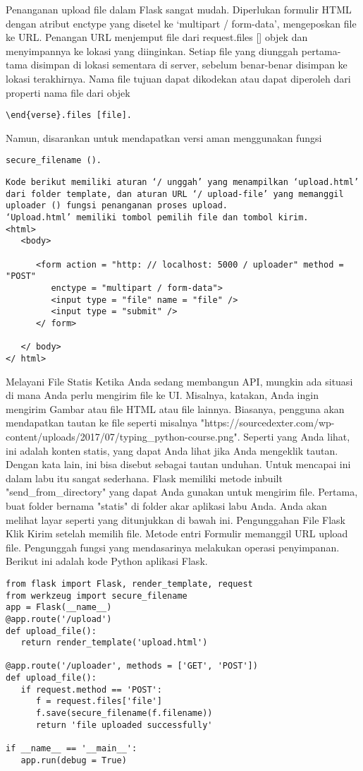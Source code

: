 \documentclass[12pt,a4paper]{article}
\begin{document}
Penanganan upload file dalam Flask sangat mudah. Diperlukan formulir HTML dengan atribut enctype yang disetel ke ‘multipart / form-data’, mengeposkan file ke URL. Penangan URL menjemput file dari request.files [] objek dan menyimpannya ke lokasi yang diinginkan. Setiap file yang diunggah pertama-tama disimpan di lokasi sementara di server, sebelum benar-benar disimpan ke lokasi terakhirnya. Nama file tujuan dapat dikodekan atau dapat diperoleh dari properti nama file dari objek 
\begin{verbatim}
\end{verse}.files [file]. 
\end{verbatim}
Namun, disarankan untuk mendapatkan versi aman menggunakan fungsi 
\begin{verbatim}
secure_filename ().
\end{verbatim}
\begin{verbatim}
Kode berikut memiliki aturan ‘/ unggah’ yang menampilkan ‘upload.html’ dari folder template, dan aturan URL ‘/ upload-file’ yang memanggil uploader () fungsi penanganan proses upload.
‘Upload.html’ memiliki tombol pemilih file dan tombol kirim.
<html>
   <body>
   
      <form action = "http: // localhost: 5000 / uploader" method = "POST"
         enctype = "multipart / form-data">
         <input type = "file" name = "file" />
         <input type = "submit" />
      </ form>
      
   </ body>
</ html>
\end{verbatim}
Melayani File Statis
Ketika Anda sedang membangun API, mungkin ada situasi di mana Anda perlu mengirim file ke UI. Misalnya, katakan, Anda ingin mengirim Gambar atau file HTML atau file lainnya. Biasanya, pengguna akan mendapatkan tautan ke file seperti misalnya "https://sourcedexter.com/wp-content/uploads/2017/07/typing\_python-course.png". Seperti yang Anda lihat, ini adalah konten statis, yang dapat Anda lihat jika Anda mengeklik tautan. Dengan kata lain, ini bisa disebut sebagai tautan unduhan.
Untuk mencapai ini dalam labu itu sangat sederhana. Flask memiliki metode inbuilt "send\_from\_directory" yang dapat Anda gunakan untuk mengirim file. Pertama, buat folder bernama "statis" di folder akar aplikasi labu Anda.
Anda akan melihat layar seperti yang ditunjukkan di bawah ini. Pengunggahan File Flask Klik Kirim setelah memilih file. Metode entri Formulir memanggil URL upload file. Pengunggah fungsi yang mendasarinya melakukan operasi penyimpanan.
Berikut ini adalah kode Python aplikasi Flask.
\begin{verbatim}
from flask import Flask, render_template, request
from werkzeug import secure_filename
app = Flask(__name__)
@app.route('/upload')
def upload_file():
   return render_template('upload.html')
	
@app.route('/uploader', methods = ['GET', 'POST'])
def upload_file():
   if request.method == 'POST':
      f = request.files['file']
      f.save(secure_filename(f.filename))
      return 'file uploaded successfully'
		
if __name__ == '__main__':
   app.run(debug = True)
\end{verbatim}
\end{document}
